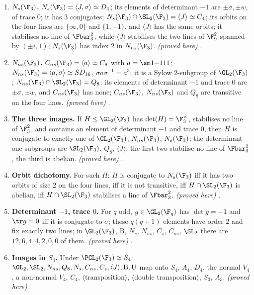 \begin{enumerate}[label=\textbf{\thechapter.\arabic*}]
\item \textbf{$N_s(\F_3)$.} $N_s(\F_3)=\langle J,\sigma\rangle\simeq D_4$; its elements of determinant $-1$ are $\pm\sigma,\pm w$, of trace $0$; it has $3$
conjugates; $N_s(\F_3)\cap\SL_2(\F_3)=\langle J\rangle\simeq C_4$; its orbits on the four lines are $\{\infty,0\}$ and $\{1,-1\}$, and $\langle J\rangle$ has
the same orbits; it stabilises no line of $\Fbar_3^2$, while $\langle J\rangle$ stabilises the two lines of $\F_9^2$ spanned by $(\pm i,1)$;
$N_s(\F_3)$ has index $2$ in $N_{ns}(\F_3)$. \emph{(proved here)} .
\item \textbf{$N_{ns}(\F_3)$.} $C_{ns}(\F_3)=\langle a\rangle\simeq C_8$ with $a=\sm1{-1}11$; $N_{ns}(\F_3)=\langle a,\sigma\rangle\simeq SD_{16}$, $\sigma a\sigma^{-1}=a^3$; it is a Sylow
$2$-subgroup of $\GL_2(\F_3)$; $N_{ns}(\F_3)\cap\SL_2(\F_3)=Q_8$; its elements of determinant $-1$ and trace $0$ are $\pm\sigma,\pm w$, and
$C_{ns}(\F_3)$ has none; $C_{ns}(\F_3)$, $N_{ns}(\F_3)$ and $Q_8$ are transitive on the four lines. \emph{(proved here)} .
\item \textbf{The three images.} If $H\le\GL_2(\F_3)$ has $\det(H)=\F_3^\times$, stabilises no line of $\F_3^2$, and contains an element of
determinant $-1$ and trace $0$, then $H$ is conjugate to exactly one of $\GL_2(\F_3)$, $N_{ns}(\F_3)$, $N_s(\F_3)$; the determinant-one
subgroups are $\SL_2(\F_3)$, $Q_8$, $\langle J\rangle$; the first two stabilise no line of $\Fbar_3^2$, the third is abelian. \emph{(proved here)}
.
\item \textbf{Orbit dichotomy.} For such $H$: $H$ is conjugate to $N_s(\F_3)$ iff it has two orbits of size $2$ on the four lines, iff it
is not transitive, iff $H\cap\SL_2(\F_3)$ is abelian, iff $H\cap\SL_2(\F_3)$ stabilises a line of $\Fbar_3^2$. \emph{(proved here)}
.
\item \textbf{Determinant $-1$, trace $0$.} For $q$ odd, $g\in\GL_2(\F_q)$ has $\det g=-1$ and $\tr g=0$ iff it is conjugate to $\sigma$; these $q(q+1)$
elements have order $2$ and fix exactly two lines; in $\GL_2(\F_3)$, $\mathrm B$, $N_s$, $N_{ns}$, $C_s$, $C_{ns}$, $\SL_2$ there are $12,6,4,4,2,0,0$ of them.
\emph{(proved here)} .
\item \textbf{Images in $S_4$.} Under $\PGL_2(\F_3)\simeq S_4$: $\GL_2,\SL_2,N_{ns},Q_8,N_s,C_{ns},C_s,\langle J\rangle,\mathrm B,\mathrm U$ map onto $S_4$, $A_4$, $D_4$,
the normal $V_4$, a non-normal $V_4$, $C_4$, $\langle$transposition$\rangle$, $\langle$double transposition$\rangle$, $S_3$, $A_3$. \emph{(proved here)}

\end{enumerate}
